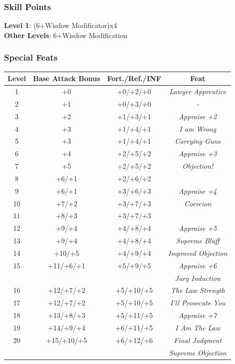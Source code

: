 \documentclass[ letterpaper,12pt]{article}
\begin{document}
\subsubsection{Skill Points}
{\bf Level 1}: (6+Wisdow Modificator)x4\\
{\bf Other Levels}: 6+Wisdow Modification\\

\subsubsection{Special Feats}

\begin{center} \begin{tabular}{|c||c|c|c|}
\hline
{\bf Level}&{\bf Base Attack Bonus}&{\bf Fort./Ref./INF}&{\bf Feat}\\
\hline
1&+0&+0/+2/+0&{\it Lawyer Apprentice}\\
\hline
2&+1&+0/+3/+0&{\it - }\\
\hline
3&+2&+1/+3/+1&{\it Appraise +2}\\
\hline
4&+3&+1/+4/+1&{\it I am Wrong}\\
\hline
5&+3&+1/+4/+1&{\it Carrying Guns}\\
\hline
6&+4&+2/+5/+2&{\it Appraise +3}\\
\hline
7&+5&+2/+5/+2&{\it Objection!}\\
\hline
8&+6/+1&+2/+6/+2&\\
\hline
9 & +6/+1& +3/+6/+3 & {\it Appraise +4}\\
\hline
10 & +7/+2 & +3/+7/+3 & {\it Coercion}\\
\hline
11 & +8/+3 & +3/+7/+3 &\\
\hline
12 & +9/+4 & +4/+8/+4 & {\it Appraise +5}\\
\hline
13 & +9/+4 & +4/+8/+4 & {\it Supreme Bluff}\\
\hline
14 & +10/+5 & +4/+9/+4 & {\it Improved Objection}\\
\hline
15 & +11/+6/+1 & +5/+9/+5 & {\it Appraise +6}\\
   &           &          & {\it Jury Induction}\\
\hline
16 & +12/+7/+2 & +5/+10/+5 & {\it The Law Strength}\\
\hline
17 & +12/+7/+2 & +5/+10/+5 & {\it I'll Prosecute You}\\
\hline
18 & +13/+8/+3 & +5/+11/+5 & {\it Appraise +7}\\
\hline
19 & +14/+9/+4 & +6/+11/+5 & {\it I Am The Law}\\
\hline
20 & +15/+10/+5 & +6/+12/+6 & {\it Final Judgment}\\
   &            &           & {\it Supreme Objection}\\
\hline
\end{tabular} \end{center}
\end{document}
